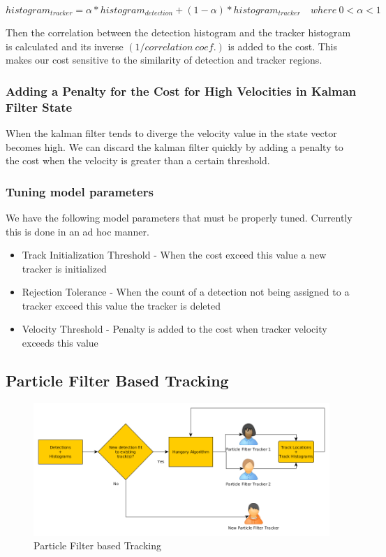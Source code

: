 \documentclass[12pt,a4paper]{report}
\begin{document}
\begin{equation}
histogram_{tracker} = \alpha * histogram_{detection} + (1-\alpha) *histogram_{tracker} \quad where \ 0 < \alpha < 1
\end{equation}

Then the correlation between the detection histogram and the tracker histogram is calculated and its inverse $(1/correlation \ coef.)$ is added to the cost. This makes our cost sensitive to the similarity of detection and tracker regions.

\subsubsection{Adding a Penalty for the Cost for High Velocities in Kalman Filter State}

When the kalman filter tends to diverge the velocity value in the state vector becomes high. We can discard the kalman filter quickly by adding a penalty to the cost when the velocity is greater than a certain threshold.

\subsubsection{Tuning model parameters}
We have the following model parameters that must be properly tuned. Currently this is done in an ad hoc manner.

\begin{itemize}
\item Track Initialization Threshold - When the cost exceed this value a new tracker is initialized
\item Rejection Tolerance - When the count of a detection not being assigned to a tracker exceed this value the tracker is deleted
\item Velocity Threshold - Penalty is added to the cost when tracker velocity exceeds this value
\end{itemize}

\subsection{Particle Filter Based Tracking}
\begin{figure}[H]
\includegraphics[width=\textwidth]{particle_filter.png}
\centering
\caption{Particle Filter based Tracking}
\label{particle}
\end{figure}
\end{document}
